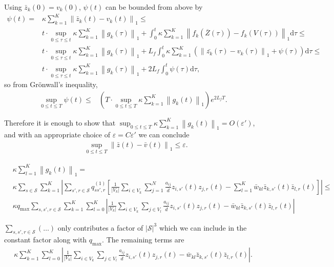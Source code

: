 \documentclass{article}
\renewcommand{\d}{\mathrm{d}}
\newcommand{\1}[1]{{\mathds{1}}_{\left\{#1\right\}}}
\begin{document}
	Using $\bar{z}_k(0)=v_k(0)$, $\psi(t)$ can be bounded from above by
	\begin{align*}
		\psi(t)=&\kappa \sum_{k=1}^{K} \left \|\bar{z}_k(t) -v_k(t)\right \|_1 \leq\\
		&t \cdot \sup_{0 \leq \tau \leq t} \kappa \sum_{k=1}^{K} \left \|g_{k}(\tau) \right \|_1+\int_{0}^{t} \kappa \sum_{k=1}^{K} \left \|f_{k}\left(\overline{Z}(\tau) \right)-f_k \left(V(\tau)\right) \right \|_1 \d \tau \leq \\
		& t \cdot \sup_{0 \leq \tau \leq t} \kappa \sum_{k=1}^{K} \left \|g_{k}(\tau) \right \|_1+L_f\int_{0}^{t} \kappa \sum_{k=1}^{K} \left(\left \|\bar{z_k}(\tau)-v_k(\tau)\right \|_1+\psi(\tau) \right) \d \tau \leq \\
		&  t \cdot \sup_{0 \leq \tau \leq t} \kappa \sum_{k=1}^{K} \left \|g_{k}(\tau) \right \|_1+2L_{f} \int_{0}^{t}\psi(\tau) \d \tau,
	\end{align*}
	so from Grönwall's inequality,
	\begin{align*}
		\sup_{0 \leq t \leq T} \psi(t) \leq & \left(T \cdot \sup_{0 \leq t \leq T} \kappa \sum_{k=1}^{K} \left \|g_{k}(t) \right \|_1 \right) e^{2L_f T}.
	\end{align*}
	
	Therefore it is enough to show that $\sup_{0 \leq t \leq T} \kappa \sum_{k=1}^{K} \left \|g_{k}(t) \right \|_1 =O\left(\varepsilon'\right)$, and with an appropriate choice of $\varepsilon=C\varepsilon'$ we can conclude
	\begin{align*}
		&\sup_{0 \leq t \leq T} \left \|\bar{z}(t)-\bar{v}(t) \right \|_1 \leq  \varepsilon.
	\end{align*}
	
	\begin{align*}
		&\kappa \sum_{l=1}^K \left \|g_{k}(t) \right \|_{1} =\\
		& \kappa \sum_{s \in \mathcal{S}}\sum_{k=1}^K \left| \sum_{s',r \in \mathcal{S}}q_{ss',r}^{(1)} \left[\frac{1}{\left|V_k \right|}\sum_{i \in V_k}\sum_{j=1}^{N} \frac{a_{ij}}{\bar{d}}z_{i,s'}(t)z_{j,r}(t)-\sum_{l=1}^{K}{\bar{w}_{kl}}\bar{z}_{k,s'}(t)\bar{z}_{l,r}(t) \right] \right| \leq \\
		& \kappa q_{\max} \sum_{s,s',r\in \mathcal{S}}\sum_{k=1}^{K}\sum_{l=0}^{K} \left| \frac{1}{|V_k|}\sum_{i \in V_k}\sum_{j \in V_l} \frac{a_{ij}}{\bar{d}}z_{i,s'}(t)z_{j,r}(t)-\bar{w}_{kl}\bar{z}_{k,s'}(t)\bar{z}_{l,r}(t) \right|	
	\end{align*}
	
	$\sum_{s,s',r\in \mathcal{S}}(\dots)$ only contributes a factor of $\left |\mathcal{S} \right |^3$ which we can include in the constant factor along with $q_{\max}.$ The remaining terms are
	\begin{align}
		\label{eq:hard_work}
		\kappa \sum_{k=1}^{K}\sum_{l=0}^{K} \left| \frac{1}{|V_k|}\sum_{i \in V_k}\sum_{j \in V_l} \frac{a_{ij}}{\bar{d}}z_{i,s'}(t)z_{j,r}(t)-\bar{w}_{kl}\bar{z}_{k,s'}(t)\bar{z}_{l,r}(t) \right|.	
	\end{align}
	
\end{document}

